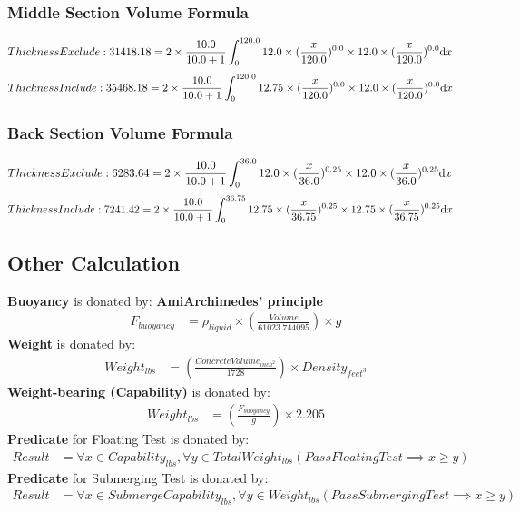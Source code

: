 \documentclass{article}%
\begin{document}
%
\subsubsection{Middle Section Volume Formula}%
\label{ssubsec:MiddleSectionVolumeFormula}%
\begin{align}%
Thickness Exclude: 31418.18 &=2\times \frac{10.0}{10.0+1} \int_0^{120.0} 12.0\times(\frac{x}{120.0})^{0.0}\times 12.0\times(\frac{x}{120.0})^{0.0} \mathrm{d}x \notag%
\end{align}%
\begin{align}%
Thickness Include: 35468.18 &=2\times \frac{10.0}{10.0+1} \int_0^{120.0} 12.75\times(\frac{x}{120.0})^{0.0}\times 12.0\times(\frac{x}{120.0})^{0.0} \mathrm{d}x \notag%
\end{align}

%
\subsubsection{Back Section Volume Formula}%
\label{ssubsec:BackSectionVolumeFormula}%
\begin{align}%
Thickness Exclude: 6283.64 &=2\times \frac{10.0}{10.0+1} \int_0^{36.0} 12.0\times(\frac{x}{36.0})^{0.25}\times 12.0\times(\frac{x}{36.0})^{0.25} \mathrm{d}x \notag%
\end{align}%
\begin{align}%
Thickness Include: 7241.42 &=2\times \frac{10.0}{10.0+1} \int_0^{36.75} 12.75\times(\frac{x}{36.75})^{0.25}\times 12.75\times(\frac{x}{36.75})^{0.25} \mathrm{d}x \notag%
\end{align}

%
\subsection{Other Calculation}%
\label{subsec:OtherCalculation}%
\textbf{Buoyancy} is donated by: \textbf{AmiArchimedes' principle}%
\begin{align}%
F_{buoyancy} &=\rho_{liquid}\times (\frac{Volume}{61023.744095}) \times g\label{C}%
\end{align}%
\textbf{Weight} is donated by: %
\begin{align}%
Weight_{lbs} &=(\frac{ConcreteVolume_{inch^2}}{1728})\times Density_{feet^3}\label{D}%
\end{align}%
\textbf{Weight-bearing (Capability)} is donated by: %
\begin{align}%
Weight_{lbs} &=(\frac{F_{buoyancy}}{g})\times 2.205 \label{E}%
\end{align}%
\textbf{Predicate} for Floating Test is donated by: %
\begin{align}%
Result &= \forall x\in Capability_{lbs}, \forall y\in TotalWeight_{lbs} (Pass Floating Test \implies x \geq y) \label{E}%
\end{align}%
\textbf{Predicate} for Submerging Test is donated by: %
\begin{align}%
Result &= \forall x\in SubmergeCapability_{lbs}, \forall y\in Weight_{lbs} (Pass Submerging Test \implies x \geq y) \label{F}%
\end{align}
\end{document}
